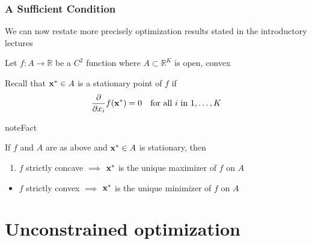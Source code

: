 \documentclass[letterpaper,10pt,english]{jupyterBook}
\begin{document}
\subsection{A Sufficient Condition}
\label{\detokenize{06.optimization_fundamentals:a-sufficient-condition}}
\sphinxAtStartPar
We can now restate more precisely optimization results stated in the
introductory lectures

\sphinxAtStartPar
Let \(f \colon A \to \mathbb{R}\) be a \(C^2\) function where \(A \subset \mathbb{R}^K\)
is open, convex

\sphinxAtStartPar
Recall that \({\bf x}^* \in A\) is a stationary point of \(f\) if
\begin{equation*}
\begin{split}
%
\frac{\partial}{\partial x_i} 
f({\bf x}^*)
= 0
\quad \text{for all $i$ in } 1, \ldots, K
%
\end{split}
\end{equation*}
\begin{sphinxadmonition}{note}{Fact}

\sphinxAtStartPar
If \(f\) and \(A\) are as above and \({\bf x}^* \in A\) is stationary, then
\end{sphinxadmonition}
\begin{enumerate}
%
\item {} 
\sphinxAtStartPar
\(f\) strictly concave \(\implies\) \({\bf x}^*\) is the unique maximizer of \(f\) on \(A\)

\end{enumerate}
\begin{itemize}
\item {} 
\sphinxAtStartPar
\(f\) strictly convex \(\implies\) \({\bf x}^*\) is the unique
minimizer of \(f\) on \(A\)

\end{itemize}

\begin{figure}[htbp]
\centering

\noindent{}
\end{figure}

\sphinxstepscope


\chapter{Unconstrained optimization}
\label{\detokenize{07.unconstrained:unconstrained-optimization}}\label{\detokenize{07.unconstrained::doc}}
\end{document}
